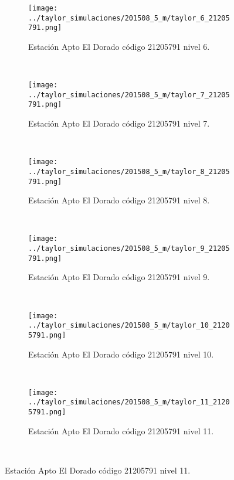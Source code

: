 \begin{figure}[H]\ContinuedFloat
\centering
\begin{subfigure}[normla]{0.4\textwidth}
\caption{Estación Apto El Dorado  código 21205791 nivel 6.}
\texttt{[image: ../taylor\_simulaciones/201508\_5\_m/taylor\_6\_21205791.png]}
\end{subfigure}
~
\begin{subfigure}[normla]{0.4\textwidth}
\caption{Estación Apto El Dorado  código 21205791 nivel 7.}
\texttt{[image: ../taylor\_simulaciones/201508\_5\_m/taylor\_7\_21205791.png]}
\end{subfigure}
~
\begin{subfigure}[normla]{0.4\textwidth}
\caption{Estación Apto El Dorado  código 21205791 nivel 8.}
\texttt{[image: ../taylor\_simulaciones/201508\_5\_m/taylor\_8\_21205791.png]}
\end{subfigure}
~
\begin{subfigure}[normla]{0.4\textwidth}
\caption{Estación Apto El Dorado  código 21205791 nivel 9.}
\texttt{[image: ../taylor\_simulaciones/201508\_5\_m/taylor\_9\_21205791.png]}
\end{subfigure}
~
\begin{subfigure}[normla]{0.4\textwidth}
\caption{Estación Apto El Dorado  código 21205791 nivel 10.}
\texttt{[image: ../taylor\_simulaciones/201508\_5\_m/taylor\_10\_21205791.png]}
\end{subfigure}
~
\begin{subfigure}[normla]{0.4\textwidth}
\caption{Estación Apto El Dorado  código 21205791 nivel 11.}
\texttt{[image: ../taylor\_simulaciones/201508\_5\_m/taylor\_11\_21205791.png]}
\end{subfigure}
~
\end{figure}
           
